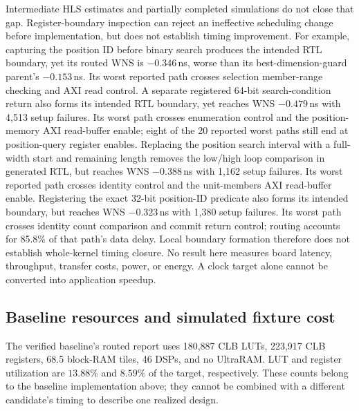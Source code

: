 \documentclass[conference,10pt]{IEEEtran}
\begin{document}
Intermediate HLS estimates and partially completed simulations do not close
that gap. Register-boundary inspection can reject an ineffective scheduling
change before implementation, but does not establish timing improvement.
For example, capturing the position ID before binary search produces the
intended RTL boundary, yet its routed WNS is $-0.346$\,ns, worse than its
best-dimension-guard parent's $-0.153$\,ns. Its worst reported path crosses
selection member-range checking and AXI read control. A separate registered
64-bit search-condition return also forms its intended RTL boundary, yet
reaches WNS $-0.479$\,ns with 4,513 setup failures. Its worst path crosses
enumeration control and the position-memory AXI read-buffer enable;
eight of the 20 reported worst paths still end at position-query register
enables. Replacing the position search interval with a full-width start and
remaining length removes the low/high loop comparison in generated RTL,
but reaches WNS $-0.388$\,ns with 1,162 setup failures. Its worst reported
path crosses identity control and the unit-members AXI read-buffer enable.
Registering the exact 32-bit position-ID predicate also forms its intended
boundary, but reaches WNS $-0.323$\,ns with 1,380 setup failures. Its worst
path crosses identity count comparison and commit return control; routing
accounts for 85.8\% of that path's data delay.
Local boundary formation therefore does not establish whole-kernel timing
closure.
No result here measures board latency, throughput, transfer costs, power,
or energy. A clock target alone cannot be converted into application speedup.

\subsection{Baseline resources and simulated fixture cost}

The verified baseline's routed report uses 180,887 CLB LUTs, 223,917 CLB
registers, 68.5 block-RAM tiles, 46 DSPs, and no UltraRAM. LUT and register
utilization are $13.88\%$ and $8.59\%$ of the target, respectively. These
counts belong to the baseline implementation above; they cannot be combined
with a different candidate's timing to describe one realized design.

\begin{table}[t]
\centering\small
\caption{Verified baseline fixture latency in XSim clock cycles. Each row
summarizes its entire suite, including the generated AXI memory model.}
\label{tab:cycles}

\end{table}
\end{document}
